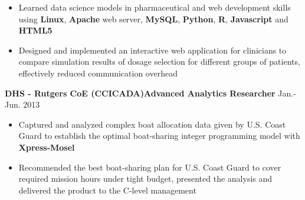 \documentclass[10.5pt]{res} %
\begin{document}
\begin{resume}
\begin{itemize}
			\item Learned data science models in pharmaceutical and web development skills using \textbf{Linux}, \textbf{Apache} web server, \textbf{MySQL}, \textbf{Python}, \textbf{R}, \textbf{Javascript} and \textbf{HTML5} %
			\item %
			Designed and implemented an interactive web application for clinicians to compare simulation results of dosage selection for different groups of patients, effectively reduced communication overhead  
		\end{itemize}\vspace{-\topsep}
    \textbf{%
    DHS - Rutgers CoE (CCICADA)}\quad\quad\textbf{Advanced Analytics Researcher}  \hfill Jan.-Jun. 2013
        \begin{itemize} pt
            \item Captured and analyzed complex boat allocation data given by U.S. Coast Guard to establish the optimal boat-sharing integer programming model with \textbf{Xpress-Mosel}%
            \item Recommended the best boat-sharing plan for U.S. Coast Guard to cover required mission hours under tight budget, presented the analysis and delivered the product to the C-level management %
        \end{itemize}\vspace{-\topsep}

\end{resume}
\end{document}
